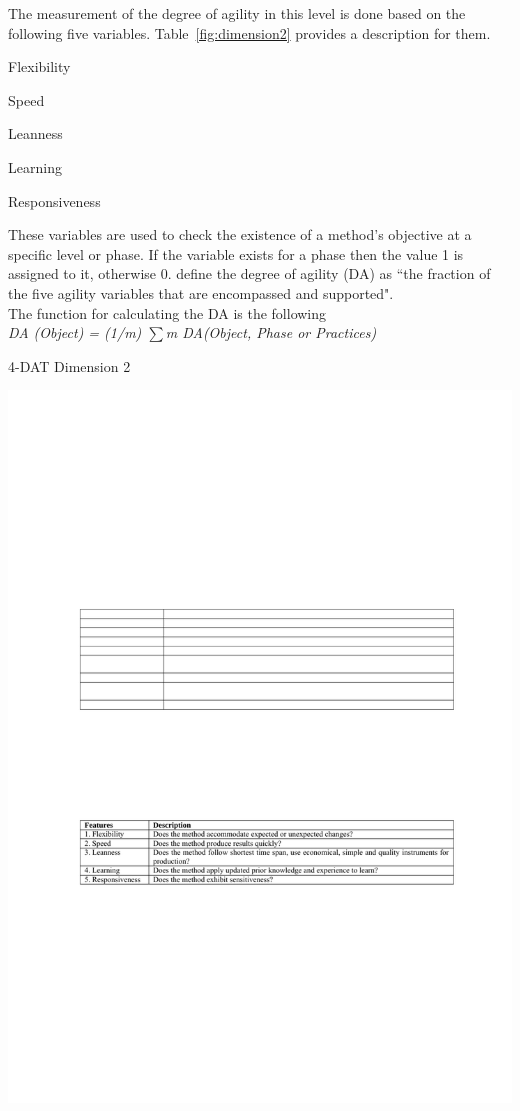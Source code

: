 The measurement of the degree of agility in this level is done based on the following five variables. Table~\ref{fig:dimension2} provides a description for them.
\begin{inparaenum} [a\upshape)]
\item Flexibility
\item Speed
\item Leanness
\item Learning
\item Responsiveness
\end{inparaenum}

These variables are used to check the existence of a method's objective at a specific level or phase. If the variable exists for a phase then the value 1 is assigned to it, otherwise 0. \citet{qumer2006measuring} define the degree of agility (DA) as ``the fraction of the five agility variables that are encompassed and supported".\\ %

The function for calculating the DA is the following\\
\textit{DA (Object) = (1/m) $\sum$m DA(Object, Phase or Practices) }

\begin{table}[H]
\caption{4-DAT Dimension 2}
\label{fig:dimension2}
\centerline{\includegraphics[scale=0.8]{include/relatedwork/fig/qumer_dimension2.pdf}}
\end{table}

